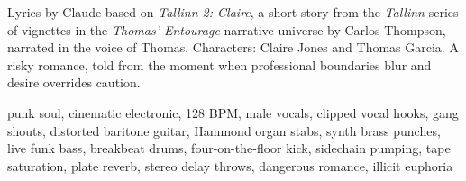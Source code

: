 

\begin{notes}
Lyrics by Claude based on \emph{Tallinn 2: Claire}, a short story from the \emph{Tallinn} series of vignettes in the \emph{Thomas’ Entourage} narrative universe by Carlos Thompson, narrated in the voice of Thomas. Characters: Claire Jones and Thomas Garcia. %
A risky romance, told from the moment when professional boundaries blur and desire overrides caution.
\end{notes}

\begin{style}
punk soul, cinematic electronic, 128 BPM, male vocals, clipped vocal hooks, gang shouts, distorted baritone guitar, Hammond organ stabs, synth brass punches, live funk bass, breakbeat drums, four-on-the-floor kick, sidechain pumping, tape saturation, plate reverb, stereo delay throws, dangerous romance, illicit euphoria
\end{style}

